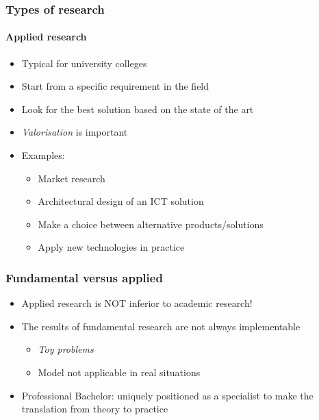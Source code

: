 \documentclass[aspectratio=169]{beamer}
\begin{document}
    \begin{frame}
        \frametitle{Types of research}
        \framesubtitle{Applied research}
        
        \begin{itemize}
            \item Typical for university colleges
            \item Start from a specific requirement in the field
            \item Look for the best solution based on the state of the art 
            \item \textit{Valorisation} is important
            \item Examples:
            \begin{itemize}
                \item Market research
                \item Architectural design of an ICT solution
                \item Make a choice between alternative products/solutions
                \item Apply new technologies in practice
            \end{itemize}
        \end{itemize}
        
    \end{frame}
    
    \begin{frame}
        \frametitle{Fundamental versus applied}
        
        \begin{itemize}
            \item Applied research is NOT inferior to academic research!
            \item The results of fundamental research are not always implementable
            \begin{itemize}
                \item \textit{Toy problems}
                \item Model not applicable in real situations
            \end{itemize}
            \item Professional Bachelor: uniquely positioned as a specialist to make the translation from theory to practice
        \end{itemize}
        
    \end{frame}
    
\end{document}
